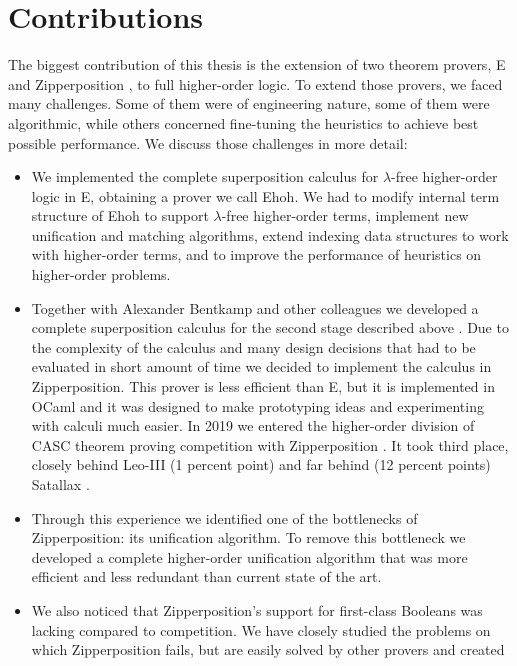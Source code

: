 \section{Contributions}

The biggest contribution of this thesis is the extension of two theorem provers,
E and Zipperposition \cite{sc-15-simon-phd}, to full higher-order logic. To
extend those provers, we faced many challenges. Some of them were of engineering
nature, some of them were algorithmic, while others concerned fine-tuning the
heuristics to achieve best possible performance. We discuss those challenges in more detail:
\begin{itemize}
  \item We implemented the complete superposition calculus for $\lambda$-free
  higher-order logic \cite{bbcw-21-lfho} in E, obtaining a prover we call Ehoh.
  We had to modify internal term structure of Ehoh to support $\lambda$-free
  higher-order terms, implement new unification and matching algorithms, extend
  indexing data structures to work with higher-order terms, and to improve the
  performance of heuristics on higher-order problems.
  \item Together with Alexander Bentkamp and other colleagues we developed
  a complete superposition calculus for the second stage described above
  \cite{bbtvw-21-sup-lam}. Due to the complexity of the calculus and many design
  decisions that had to be evaluated in short amount of time we decided to
  implement the calculus in Zipperposition. This prover is less efficient than
  E, but it is implemented in OCaml and it was designed to make prototyping
  ideas and experimenting with calculi much easier. In 2019 we entered the
  higher-order division of CASC theorem proving competition with Zipperposition
  \cite{gs-19-casc27}. It took third place, closely behind Leo-III (1 percent
  point) \cite{sb-21-leo3} and far behind (12 percent points) Satallax
  \cite{cb-12-satallax}.
  \item Through this experience we identified one of the bottlenecks of
  Zipperposition: its unification algorithm. To remove this bottleneck we
  developed a complete higher-order unification algorithm that was more
  efficient and less redundant than current state of the art. 
  \item We also noticed that Zipperposition's support for first-class Booleans
  was lacking compared to competition. We have closely studied the problems on
  which Zipperposition fails, but are easily solved by other provers and created

\end{itemize}
